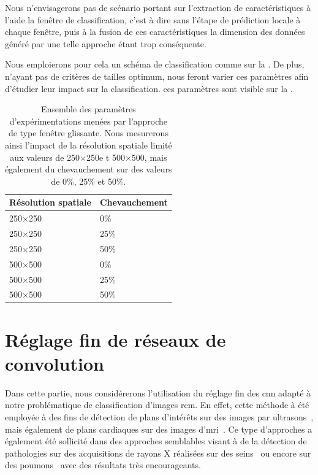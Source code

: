 Nous n'envisagerons pas de scénario portant sur l'extraction de caractéristiques à l'aide la fenêtre de classification, c'est à dire sans l'étape de prédiction locale à chaque fenêtre, puis à la fusion de ces caractéristiques la dimension des données généré par une telle approche étant trop conséquente.\par
 
Nous emploierons pour cela un schéma de classification comme sur la . De plus, n'ayant pas de critères de tailles optimum, nous feront varier ces paramètres afin d'étudier leur impact sur la classification. ces paramètres sont visible sur la .\par

\begin{table}[H]
    \centering
    \begin{tabular*}{0.6\linewidth}{l@{\extracolsep{\fill}}l}
        \toprule
        \textbf{Résolution spatiale}& \textbf{Chevauchement}   \\ \hline
        250$\times$250              & 0\%                      \\ \hline
        250$\times$250              & 25\%                     \\ \hline
        250$\times$250              & 50\%                     \\ \hline 
        500$\times$500              & 0\%                      \\ \hline
        500$\times$500              & 25\%                     \\ \hline
        500$\times$500              & 50\%                     \\
        \bottomrule
    \end{tabular*}
    \caption{Ensemble des paramètres d'expérimentations menées par l'approche de type fenêtre glissante. Nous mesurerons ainsi l'impact de la résolution spatiale limité aux valeurs de 250$\times$250e t 500$\times$500, mais également du chevauchement sur des valeurs de 0\%, 25\% et 50\%.}
    \label{tab:parameters_image_improvement_sliding_window_parameters}
\end{table}\par

\section{Réglage fin de réseaux de convolution}
Dans cette partie, nous considérerons l'utilisation du réglage fin des \gls{cnn} adapté à notre problématique de classification d'images \gls{rcm}. En effet, cette méthode à été employée à des fins de détection de plans d'intérêts sur des images par ultrasons~\cite{Chen2015}, mais également de plans cardiaques sur des images d'\gls{mri}~\cite{Margeta2017}. Ce type d'approches a également été sollicité dans des approches semblables visant à de la détection de pathologies sur des acquisitions de rayons X réalisées sur des seins~\cite{Lotter2017} ou encore sur des poumons~\cite{Gao2018} avec des résultats très encourageants.\par

